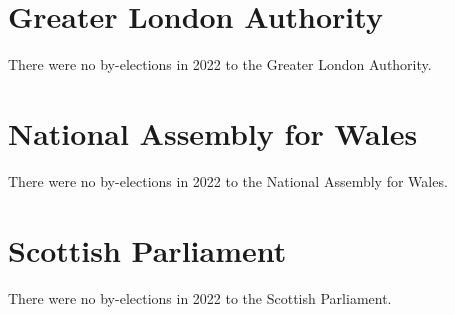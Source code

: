 \documentclass[a4paper,openany]{book}
\begin{document}
\section{Greater London Authority}

There were no by-elections in 2022 to the Greater London Authority.


\section{National Assembly for Wales}

There were no by-elections in 2022 to the National Assembly for Wales.


\section{Scottish Parliament}

There were no by-elections in 2022 to the Scottish Parliament.

%
%
%
\end{document}

